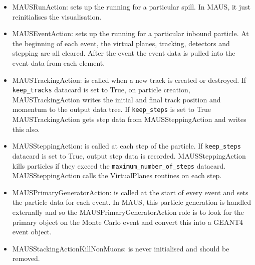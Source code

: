 \begin{itemize}
\item MAUSRunAction: sets up the running for a particular spill. In MAUS, it just reinitialises the visualisation.
\item MAUSEventAction: sets up the running for a particular inbound particle. At the beginning of each event, the virtual planes, tracking, detectors and stepping are all cleared. After the event the event data is pulled into the event data from each element.
\item MAUSTrackingAction: is called when a new track is created or destroyed. If \verb|keep_tracks| datacard is set to True, on particle creation, MAUSTrackingAction writes the initial and final track position and momentum to the output data tree. If \verb|keep_steps| is set to True MAUSTrackingAction gets step data from MAUSSteppingAction and writes this also.
\item MAUSSteppingAction: is called at each step of the particle. If \verb|keep_steps| datacard is set to True, output step data is recorded. MAUSSteppingAction kills particles if they exceed the \verb|maximum_number_of_steps| datacard. MAUSSteppingAction calls the VirtualPlanes routines on each step.
\item MAUSPrimaryGeneratorAction: is called at the start of every event and sets the particle data for each event. In MAUS, this particle generation is handled externally and so the MAUSPrimaryGeneratorAction role is to look for the primary object on the Monte Carlo event and convert this into a GEANT4 event object.
\item MAUSStackingActionKillNonMuons: is never initialised and should be removed.
\end{itemize}


